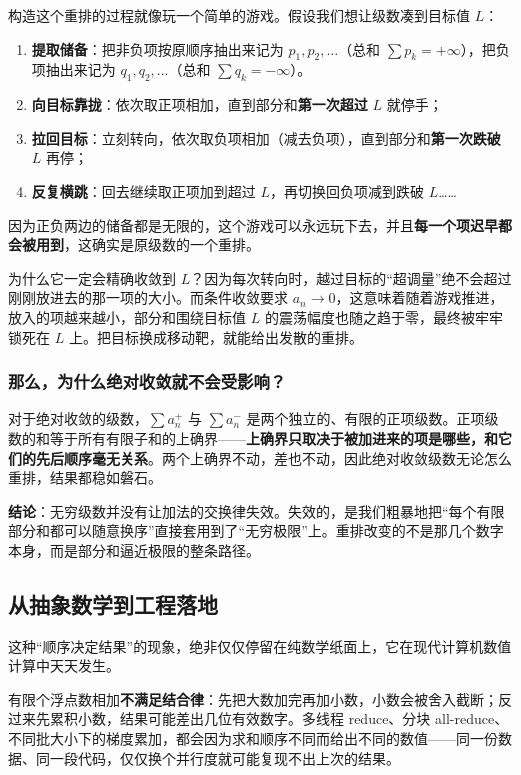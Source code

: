 构造这个重排的过程就像玩一个简单的游戏。假设我们想让级数凑到目标值 $L$：
\begin{enumerate}
    \item \textbf{提取储备}：把非负项按原顺序抽出来记为 $p_1,p_2,\dots$（总和 $\sum p_k = +\infty$），把负项抽出来记为 $q_1,q_2,\dots$（总和 $\sum q_k = -\infty$）。
    \item \textbf{向目标靠拢}：依次取正项相加，直到部分和\textbf{第一次超过} $L$ 就停手；
    \item \textbf{拉回目标}：立刻转向，依次取负项相加（减去负项），直到部分和\textbf{第一次跌破} $L$ 再停；
    \item \textbf{反复横跳}：回去继续取正项加到超过 $L$，再切换回负项减到跌破 $L$……
\end{enumerate}

因为正负两边的储备都是无限的，这个游戏可以永远玩下去，并且\textbf{每一个项迟早都会被用到}，这确实是原级数的一个重排。

为什么它一定会精确收敛到 $L$？因为每次转向时，越过目标的“超调量”绝不会超过刚刚放进去的那一项的大小。而条件收敛要求 $a_n \to 0$，这意味着随着游戏推进，放入的项越来越小，部分和围绕目标值 $L$ 的震荡幅度也随之趋于零，最终被牢牢锁死在 $L$ 上。把目标换成移动靶，就能给出发散的重排。

\subsubsection*{那么，为什么绝对收敛就不会受影响？}

对于绝对收敛的级数，\(\sum a_n^+\) 与 \(\sum a_n^-\) 是两个独立的、有限的正项级数。正项级数的和等于所有有限子和的上确界——\textbf{上确界只取决于被加进来的项是哪些，和它们的先后顺序毫无关系}。两个上确界不动，差也不动，因此绝对收敛级数无论怎么重排，结果都稳如磐石。

\textbf{结论}：无穷级数并没有让加法的交换律失效。失效的，是我们粗暴地把“每个有限部分和都可以随意换序”直接套用到了“无穷极限”上。重排改变的不是那几个数字本身，而是部分和逼近极限的整条路径。

\subsection{从抽象数学到工程落地}

这种“顺序决定结果”的现象，绝非仅仅停留在纯数学纸面上，它在现代计算机数值计算中天天发生。

有限个浮点数相加\textbf{不满足结合律}：先把大数加完再加小数，小数会被舍入截断；反过来先累积小数，结果可能差出几位有效数字。多线程 reduce、分块 all-reduce、不同批大小下的梯度累加，都会因为求和顺序不同而给出不同的数值——同一份数据、同一段代码，仅仅换个并行度就可能复现不出上次的结果。

